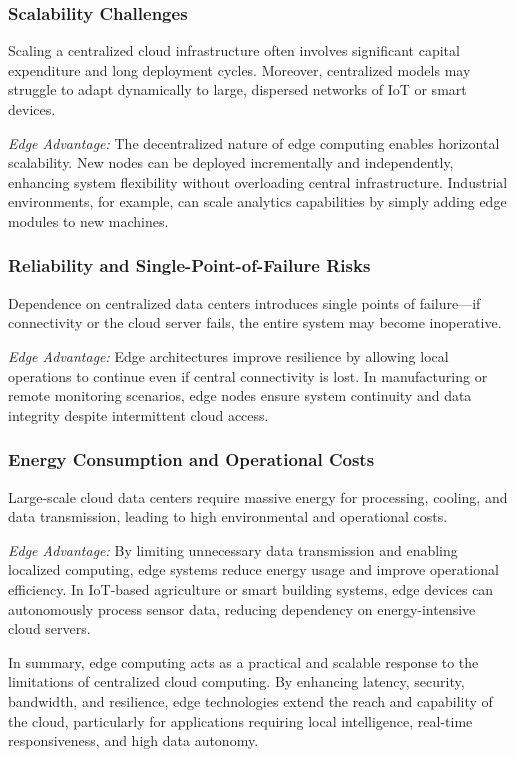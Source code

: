 \documentclass[runningheads]{llncs}
\begin{document}
\subsubsection{Scalability Challenges}
Scaling a centralized cloud infrastructure often involves significant capital expenditure and long deployment cycles. Moreover, centralized models may struggle to adapt dynamically to large, dispersed networks of IoT or smart devices.

\noindent\textit{Edge Advantage:} The decentralized nature of edge computing enables horizontal scalability. New nodes can be deployed incrementally and independently, enhancing system flexibility without overloading central infrastructure. Industrial environments, for example, can scale analytics capabilities by simply adding edge modules to new machines.

\subsubsection{Reliability and Single-Point-of-Failure Risks}
Dependence on centralized data centers introduces single points of failure—if connectivity or the cloud server fails, the entire system may become inoperative.

\noindent\textit{Edge Advantage:} Edge architectures improve resilience by allowing local operations to continue even if central connectivity is lost. In manufacturing or remote monitoring scenarios, edge nodes ensure system continuity and data integrity despite intermittent cloud access.

\subsubsection{Energy Consumption and Operational Costs}
Large-scale cloud data centers require massive energy for processing, cooling, and data transmission, leading to high environmental and operational costs.

\noindent\textit{Edge Advantage:} By limiting unnecessary data transmission and enabling localized computing, edge systems reduce energy usage and improve operational efficiency. In IoT-based agriculture or smart building systems, edge devices can autonomously process sensor data, reducing dependency on energy-intensive cloud servers.

\bigskip

\noindent In summary, edge computing acts as a practical and scalable response to the limitations of centralized cloud computing. By enhancing latency, security, bandwidth, and resilience, edge technologies extend the reach and capability of the cloud, particularly for applications requiring local intelligence, real-time responsiveness, and high data autonomy.
\end{document}
